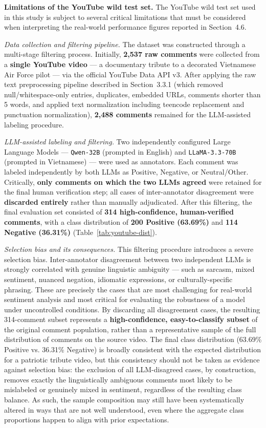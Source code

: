 \documentclass[12pt]{report} %
\begin{document}
\textbf{Limitations of the YouTube wild test set.} The YouTube wild test set used in this study is subject to several critical limitations that must be considered when interpreting the real-world performance figures reported in Section~4.6.

\textit{Data collection and filtering pipeline.} The dataset was constructed through a multi-stage filtering process. Initially, \textbf{2,537 raw comments} were collected from a \textbf{single YouTube video} — a documentary tribute to a decorated Vietnamese Air Force pilot — via the official YouTube Data API v3. After applying the raw text preprocessing pipeline described in Section~3.3.1 (which removed null/whitespace-only entries, duplicates, embedded URLs, comments shorter than 5 words, and applied text normalization including teencode replacement and punctuation normalization), \textbf{2,488 comments} remained for the LLM-assisted labeling procedure.

\textit{LLM-assisted labeling and filtering.} Two independently configured Large Language Models — \texttt{Qwen-32B} (prompted in English) and \texttt{LLaMA-3.3-70B} (prompted in Vietnamese) — were used as annotators. Each comment was labeled independently by both LLMs as Positive, Negative, or Neutral/Other. Critically, \textbf{only comments on which the two LLMs agreed} were retained for the final human verification step; all cases of inter-annotator disagreement were \textbf{discarded entirely} rather than manually adjudicated. After this filtering, the final evaluation set consisted of \textbf{314 high-confidence, human-verified comments}, with a class distribution of \textbf{200 Positive (63.69\%)} and \textbf{114 Negative (36.31\%)} (Table~\ref{tab:youtube-dist}).

\textit{Selection bias and its consequences.} This filtering procedure introduces a severe selection bias. Inter-annotator disagreement between two independent LLMs is strongly correlated with genuine linguistic ambiguity --- such as sarcasm, mixed sentiment, nuanced negation, idiomatic expressions, or culturally-specific phrasing. These are precisely the cases that are most challenging for real-world sentiment analysis and most critical for evaluating the robustness of a model under uncontrolled conditions. By discarding all disagreement cases, the resulting 314-comment subset represents a \textbf{high-confidence, easy-to-classify subset} of the original comment population, rather than a representative sample of the full distribution of comments on the source video. The final class distribution (63.69\% Positive vs. 36.31\% Negative) is broadly consistent with the expected distribution for a patriotic tribute video, but this consistency should not be taken as evidence against selection bias: the exclusion of all LLM-disagreed cases, by construction, removes exactly the linguistically ambiguous comments most likely to be mislabeled or genuinely mixed in sentiment, regardless of the resulting class balance. As such, the sample composition may still have been systematically altered in ways that are not well understood, even where the aggregate class proportions happen to align with prior expectations.
\end{document}
